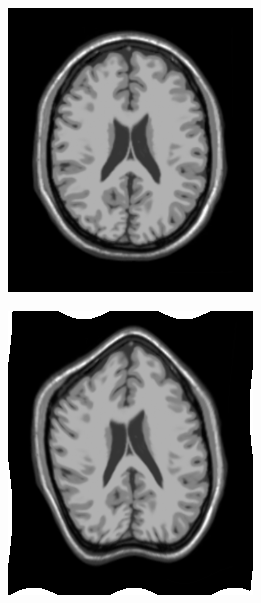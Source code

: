 \begin{figure}[H]
	\centering
	\begin{subfigure}[t]{0.23\textwidth}
	  \includegraphics[width=\textwidth]{figuras/screen.png}
	  \label{fig:ref-image}
	\end{subfigure}
	\begin{subfigure}[t]{0.23\textwidth}
	  \includegraphics[width=\textwidth]{figuras/movingImageSin.png}

\end{subfigure}
\end{figure}
